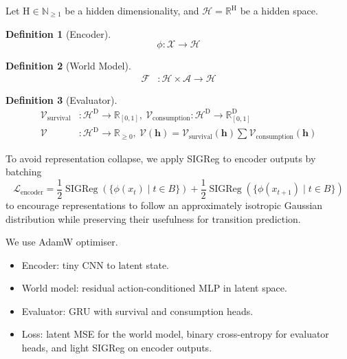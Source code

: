 \documentclass[10pt]{article}
\theoremstyle{definition}
\newtheorem{definition}{Definition}
\theoremstyle{remark}
\newcommand{\N}{\mathbb{N}}
\newcommand{\R}{\mathbb{R}}
\begin{document}
Let $\mathrm{H}\in\N_{\geq 1}$ be a hidden dimensionality,
and $\mathcal{H}=\R^{\mathrm{H}}$ be a hidden space.

\begin{definition}[Encoder]
$$
	\phi:\mathcal{X}\to\mathcal{H}
$$
\end{definition}

\begin{definition}[World Model]
\begin{align*}
	\mathscr{F}
	&:
	\mathcal{H}\times\mathcal{A}
	\to
	\mathcal{H}
\end{align*}
\end{definition}

\begin{definition}[Evaluator]
\begin{align*}
	\mathscr{V}_\mathrm{survival}
	&:
	\mathcal{H}^{\mathrm D} %
	\to
	\R_{[0,1]} %
	,\ 
	\mathscr{V}_\mathrm{consumption}
	:
	\mathcal{H}^{\mathrm D} %
	\to
	\R_{[0,1]}^{\mathrm D} %
	\\
	\mathscr{V}
	&:
	\mathcal{H}^{\mathrm D} %
	\to
	\R_{\geq 0}
	,\ 
	\mathscr{V}(\bm{h})
	=
	\mathscr{V}_\mathrm{survival}(\bm{h})
	\bm{\sum}
	\mathscr{V}_\mathrm{consumption}(\bm{h})
\end{align*}
\end{definition}


To avoid representation collapse, we apply SIGReg to encoder outputs by batching
$$
	\mathcal{L}_\mathrm{encoder}
	=
	\frac{1}{2}
	\operatorname{SIGReg}(\{\phi(x_{t})\mid t\in B\})
	+
	\frac{1}{2}
	\operatorname{SIGReg}(\{\phi(x_{t+1})\mid t\in B\})
$$
to encourage representations to follow an approximately isotropic Gaussian distribution while preserving their usefulness for transition prediction.


We use AdamW optimiser.
\begin{itemize}
	\item Encoder: tiny CNN to latent state.
	\item World model: residual action-conditioned MLP in latent space.
	\item Evaluator: GRU with survival and consumption heads.
	\item Loss: latent MSE for the world model, binary cross-entropy for evaluator heads, and light SIGReg on encoder outputs.
\end{itemize}
\end{document}
